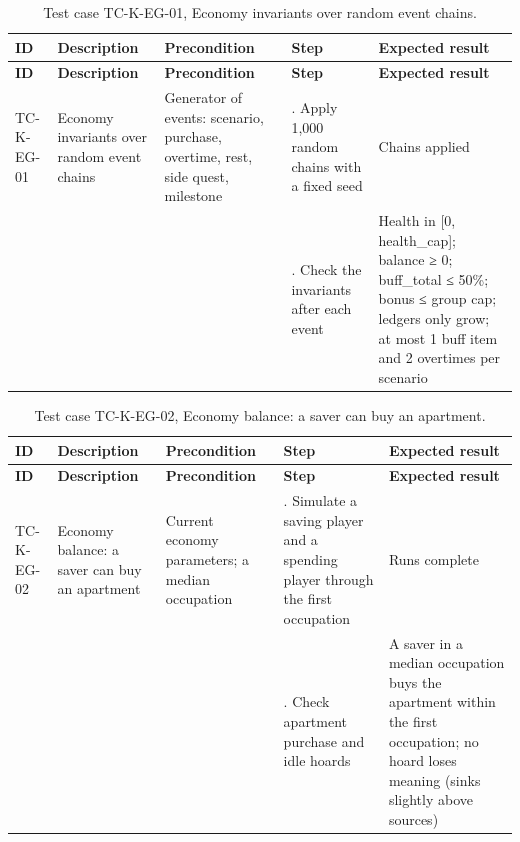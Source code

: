 {\small
\begin{longtable}{|>{\raggedright\arraybackslash}p{}|>{\raggedright\arraybackslash}p{}|>{\raggedright\arraybackslash}p{}|>{\raggedright\arraybackslash}p{}|>{\raggedright\arraybackslash}p{}|}
\caption{Test case TC-K-EG-01, Economy invariants over random event chains.} \\
\hline
\textbf{ID} & \textbf{Description} & \textbf{Precondition} & \textbf{Step} & \textbf{Expected result} \\ \hline
\endfirsthead
\hline
\textbf{ID} & \textbf{Description} & \textbf{Precondition} & \textbf{Step} & \textbf{Expected result} \\ \hline
\endhead
TC-K-EG-01 & Economy invariants over random event chains & Generator of events: scenario, purchase, overtime, rest, side quest, milestone & 1. Apply 1,000 random chains with a fixed seed & Chains applied \\ \hline
 &  &  & 2. Check the invariants after each event & Health in [0, health\_cap]; balance ≥ 0; buff\_total ≤ 50\%; bonus ≤ group cap; ledgers only grow; at most 1 buff item and 2 overtimes per scenario \\ \hline
\end{longtable}
}

{\small
\begin{longtable}{|>{\raggedright\arraybackslash}p{}|>{\raggedright\arraybackslash}p{}|>{\raggedright\arraybackslash}p{}|>{\raggedright\arraybackslash}p{}|>{\raggedright\arraybackslash}p{}|}
\caption{Test case TC-K-EG-02, Economy balance: a saver can buy an apartment.} \\
\hline
\textbf{ID} & \textbf{Description} & \textbf{Precondition} & \textbf{Step} & \textbf{Expected result} \\ \hline
\endfirsthead
\hline
\textbf{ID} & \textbf{Description} & \textbf{Precondition} & \textbf{Step} & \textbf{Expected result} \\ \hline
\endhead
TC-K-EG-02 & Economy balance: a saver can buy an apartment & Current economy parameters; a median occupation & 1. Simulate a saving player and a spending player through the first occupation & Runs complete \\ \hline
 &  &  & 2. Check apartment purchase and idle hoards & A saver in a median occupation buys the apartment within the first occupation; no hoard loses meaning (sinks slightly above sources) \\ \hline
\end{longtable}
}


